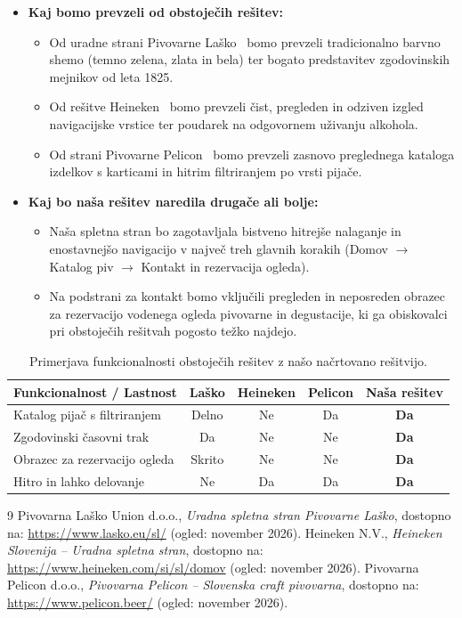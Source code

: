 \documentclass[11pt,a4paper]{article}
\begin{document}
\begin{itemize}
  \item \textbf{Kaj bomo prevzeli od obstoječih rešitev:}
  \begin{itemize}
    \item Od uradne strani Pivovarne Laško~\cite{lasko} bomo prevzeli tradicionalno barvno shemo (temno zelena, zlata in bela) ter bogato predstavitev zgodovinskih mejnikov od leta 1825.
    \item Od rešitve Heineken~\cite{heineken} bomo prevzeli čist, pregleden in odziven izgled navigacijske vrstice ter poudarek na odgovornem uživanju alkohola.
    \item Od strani Pivovarne Pelicon~\cite{pelicon} bomo prevzeli zasnovo preglednega kataloga izdelkov s karticami in hitrim filtriranjem po vrsti pijače.
  \end{itemize}
  \item \textbf{Kaj bo naša rešitev naredila drugače ali bolje:}
  \begin{itemize}
    \item Naša spletna stran bo zagotavljala bistveno hitrejše nalaganje in enostavnejšo navigacijo v največ treh glavnih korakih (Domov $\rightarrow$ Katalog piv $\rightarrow$ Kontakt in rezervacija ogleda).
    \item Na podstrani za kontakt bomo vključili pregleden in neposreden obrazec za rezervacijo vodenega ogleda pivovarne in degustacije, ki ga obiskovalci pri obstoječih rešitvah pogosto težko najdejo.
  \end{itemize}
\end{itemize}

\begin{table}[H]
  \centering
  \begin{tabular}{|l|c|c|c|c|}
    \hline
    \textbf{Funkcionalnost / Lastnost} & \textbf{Laško} & \textbf{Heineken} & \textbf{Pelicon} & \textbf{Naša rešitev} \\
    \hline
    Katalog pijač s filtriranjem & Delno & Ne & Da & \textbf{Da} \\
    \hline
    Zgodovinski časovni trak & Da & Ne & Ne & \textbf{Da} \\
    \hline
    Obrazec za rezervacijo ogleda & Skrito & Ne & Ne & \textbf{Da} \\
    \hline
    Hitro in lahko delovanje & Ne & Da & Da & \textbf{Da} \\
    \hline
  \end{tabular}
  \caption{Primerjava funkcionalnosti obstoječih rešitev z našo načrtovano rešitvijo.}
  \label{tab:primerjava}
\end{table}

\begin{thebibliography}{9}
   Pivovarna Laško Union d.o.o., \emph{Uradna spletna stran Pivovarne Laško}, dostopno na: \url{https://www.lasko.eu/sl/} (ogled: november 2026).
   Heineken N.V., \emph{Heineken Slovenija -- Uradna spletna stran}, dostopno na: \url{https://www.heineken.com/si/sl/domov} (ogled: november 2026).
   Pivovarna Pelicon d.o.o., \emph{Pivovarna Pelicon -- Slovenska craft pivovarna}, dostopno na: \url{https://www.pelicon.beer/} (ogled: november 2026).
\end{thebibliography}
\end{document}
